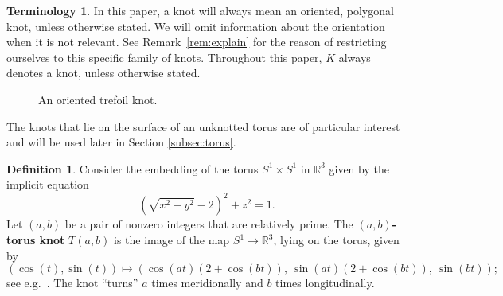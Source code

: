\documentclass[11pt,a4paper]{article}
\theoremstyle{definition}
\newtheorem{definition}[theorem]{Definition}
\newtheorem{terminology}[theorem]{Terminology}
\newcommand{\numberset}{\mathbb}
\newcommand{\R}{\numberset{R}}
\begin{document}
\begin{terminology} \label{term}
    In this paper, a knot will always mean an oriented, polygonal knot, unless otherwise stated. We will omit information about the orientation when it is not relevant.    
    See Remark~\ref{rem:explain} for the reason of restricting ourselves to this specific family of knots.
    Throughout this paper, $K$ always denotes a knot, unless otherwise stated.
\end{terminology} 

\begin{figure}[ht!]
    \centering
{}

    \caption{An oriented trefoil knot.}
    \label{fig:trefoil}
\end{figure}


The knots that lie on the surface of an unknotted torus are of particular interest and will be used later in Section \ref{subsec:torus}. 

\begin{definition} \label{def:torusknot}
Consider the embedding of the torus $S^1\times S^1$  in $\R^3$ given by the implicit equation $$\left(\sqrt{x^2+y^2}-2\right)^2+z^2=1.$$
Let $(a,b)$ be a pair of nonzero integers that are relatively prime.
The $(a,b)$\textbf{-torus knot} $T(a,b)$ 
is the image of the map $S^1 \rightarrow \R^3$, lying on the torus, given by
$$
(\cos(t),\sin(t)) \longmapsto (\cos(at)(2+\cos(bt)),\ \sin(at)(2+\cos(bt)),\ \sin(bt));
$$ 
see e.g.~\cite[Chapter~7]{murasugi1996knot}.
The knot ``turns'' $a$ times meridionally and $b$ times longitudinally.
\end{definition}
\end{document}
